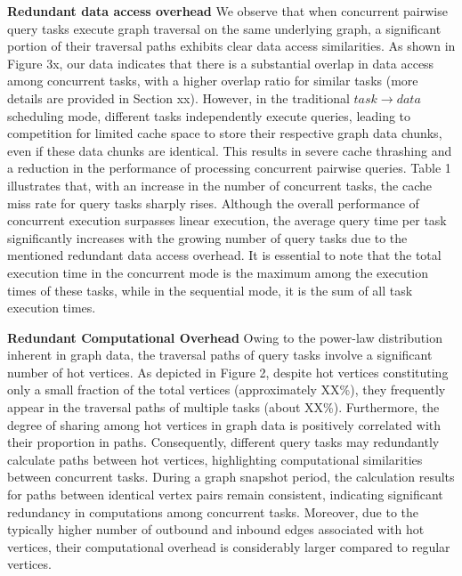 \documentclass[lettersize,journal]{IEEEtran} %
\begin{document}
{\bf{Redundant data access overhead}} We observe that when concurrent pairwise query tasks execute graph traversal on the same underlying graph, a significant portion of their traversal paths exhibits clear data access similarities. As shown in Figure 3x, our data indicates that there is a substantial overlap in data access among concurrent tasks, with a higher overlap ratio for similar tasks (more details are provided in Section xx). However, in the traditional $task \rightarrow data$ scheduling mode, different tasks independently execute queries, leading to competition for limited cache space to store their respective graph data chunks, even if these data chunks are identical. This results in severe cache thrashing and a reduction in the performance of processing concurrent pairwise queries. Table 1 illustrates that, with an increase in the number of concurrent tasks, the cache miss rate for query tasks sharply rises. Although the overall performance of concurrent execution surpasses linear execution, the average query time per task significantly increases with the growing number of query tasks due to the mentioned redundant data access overhead. It is essential to note that the total execution time in the concurrent mode is the maximum among the execution times of these tasks, while in the sequential mode, it is the sum of all task execution times.



{\bf{Redundant Computational Overhead}} Owing to the power-law distribution inherent in graph data, the traversal paths of query tasks involve a significant number of hot vertices. As depicted in Figure 2, despite hot vertices constituting only a small fraction of the total vertices (approximately XX\%), they frequently appear in the traversal paths of multiple tasks (about XX\%). Furthermore, the degree of sharing among hot vertices in graph data is positively correlated with their proportion in paths. Consequently, different query tasks may redundantly calculate paths between hot vertices, highlighting computational similarities between concurrent tasks. During a graph snapshot period, the calculation results for paths between identical vertex pairs remain consistent, indicating significant redundancy in computations among concurrent tasks. Moreover, due to the typically higher number of outbound and inbound edges associated with hot vertices, their computational overhead is considerably larger compared to regular vertices.
\end{document}
